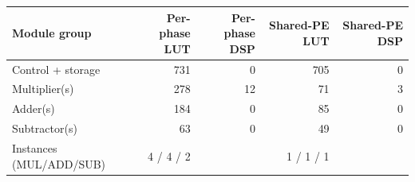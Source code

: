 \begin{tabular}{@{}lrrrr@{}}
\toprule
Module group & Per-phase LUT & Per-phase DSP & Shared-PE LUT & Shared-PE DSP \\
\midrule
Control + storage & 731 & 0 & 705 & 0 \\
Multiplier(s) & 278 & 12 & 71 & 3 \\
Adder(s) & 184 & 0 & 85 & 0 \\
Subtractor(s) & 63 & 0 & 49 & 0 \\
Instances (MUL/ADD/SUB) & 4 / 4 / 2 &  & 1 / 1 / 1 &  \\
\bottomrule
\end{tabular}

